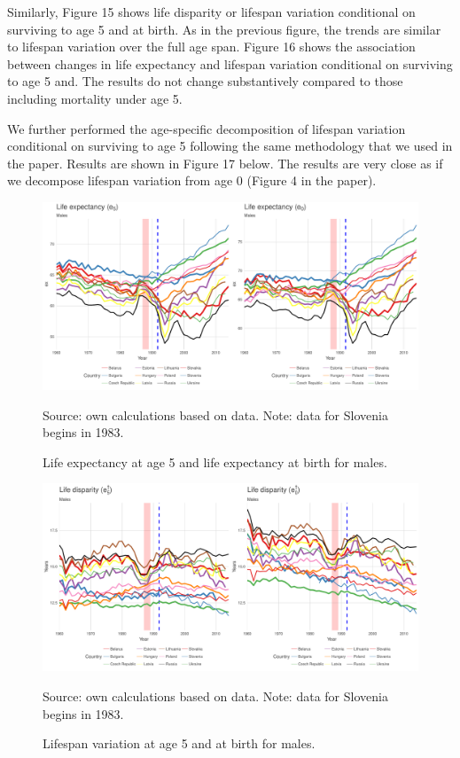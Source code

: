 \documentclass{article}
\begin{document}
Similarly, Figure 15 shows life disparity or lifespan variation conditional on surviving to age 5 and at birth. As in the previous figure, the trends are similar to lifespan variation over the full age span. Figure 16 shows the association between changes in life expectancy and lifespan variation conditional on surviving to age 5 and. The results do not change substantively compared to those including mortality under age 5.

We further performed the age-specific decomposition of lifespan variation conditional on surviving to age 5 following the same methodology that we used in the paper. Results are shown in Figure 17 below. The results are very close as if we decompose lifespan variation from age 0 (Figure 4 in the paper). 


\begin{figure}[h!]
\caption{Life expectancy at age 5 and life expectancy at birth for males.}
\centering
\begin{center}
\includegraphics[scale=.35]{Figures/e5_0_males.pdf}
\end{center}
Source: own calculations based on \citet{HMD} data. Note: data for Slovenia begins in 1983.
\end{figure}

\newpage
\begin{figure}[h!]
\caption{Lifespan variation at age 5 and at birth for males.}
\centering
\begin{center}
\includegraphics[scale=.35]{Figures/ed5_males-females.pdf}
\end{center}
Source: own calculations based on \citet{HMD} data. Note: data for Slovenia begins in 1983.
\end{figure}
\end{document}
